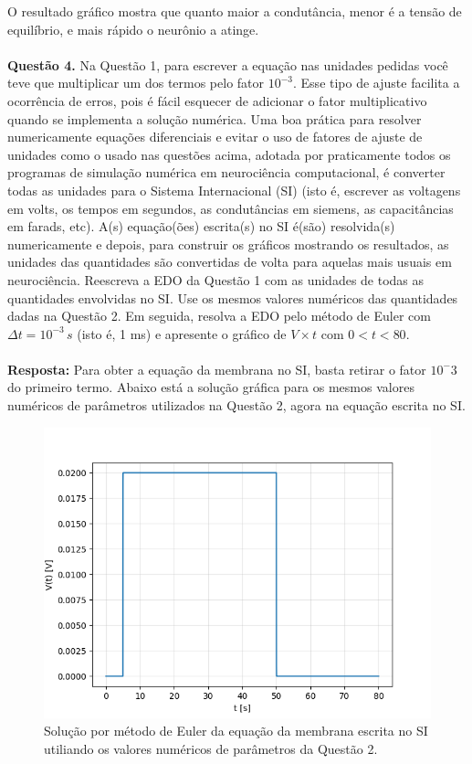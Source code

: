 \documentclass[portuguese,12pt,a4paper]{article}
\begin{document}
	O resultado gráfico mostra que quanto maior a condutância, menor é a tensão de equilíbrio, e mais rápido o neurônio a atinge.\\\\
	
	\noindent\textbf{Questão 4.} Na Questão 1, para escrever a equação nas unidades pedidas você teve que multiplicar um dos termos pelo fator $10^{-3}$. Esse tipo de ajuste facilita a ocorrência de erros, pois é fácil esquecer de adicionar o fator multiplicativo quando se implementa a solução numérica. Uma boa prática para resolver numericamente equações diferenciais e evitar o uso de fatores de ajuste de unidades como o usado nas questões acima, adotada por praticamente todos os programas de simulação numérica em neurociência computacional, é converter todas as unidades para o Sistema Internacional (SI) (isto é, escrever as voltagens em volts, os tempos em segundos, as condutâncias em siemens, as capacitâncias em farads, etc). A(s) equação(ões) escrita(s) no SI é(são) resolvida(s) numericamente e depois, para construir os gráficos mostrando os resultados, as unidades das quantidades são convertidas de volta para aquelas mais usuais em neurociência. Reescreva a EDO da Questão 1 com as unidades de todas as quantidades envolvidas no SI. Use os mesmos valores numéricos das quantidades dadas na Questão 2. Em seguida, resolva a EDO pelo método de Euler com $\Delta t = 10^{-3}\,s$ (isto é, 1 ms) e apresente o gráfico de $V \times t$ com $0 < t < 80$.
	\\\\
	
	
	\noindent\textbf{Resposta:} Para obter a equação da membrana no SI, basta retirar o fator $10^-3$ do primeiro termo. Abaixo está a solução gráfica para os mesmos valores numéricos de parâmetros utilizados na Questão 2, agora na equação escrita no SI.
	
	\begin{figure}[H]
		\centering
		\includegraphics[width=12cm]{../ex_4.png}
		\caption{Solução por método de Euler da equação da membrana escrita no SI utiliando os valores numéricos de parâmetros da Questão 2.}
	\end{figure}
	
\end{document}
